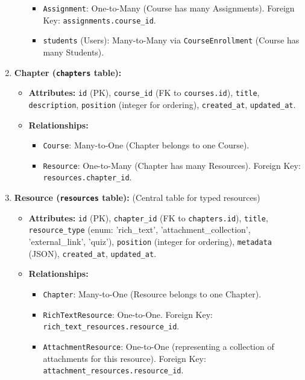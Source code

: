 \begin{enumerate}
\begin{itemize}
\begin{itemize}
            \item \texttt{Assignment}: One-to-Many (Course has many Assignments). Foreign Key: \texttt{assignments.course\_id}.
            \item \texttt{students} (Users): Many-to-Many via \texttt{CourseEnrollment} (Course has many Students).
        \end{itemize}
    \end{itemize}
    \item \textbf{Chapter (\texttt{chapters} table):}
    \begin{itemize}
        \item \textbf{Attributes:} \texttt{id} (PK), \texttt{course\_id} (FK to \texttt{courses.id}), \texttt{title}, \texttt{description}, \texttt{position} (integer for ordering), \texttt{created\_at}, \texttt{updated\_at}.
        \item \textbf{Relationships:}
        \begin{itemize}
            \item \texttt{Course}: Many-to-One (Chapter belongs to one Course).
            \item \texttt{Resource}: One-to-Many (Chapter has many Resources). Foreign Key: \texttt{resources.chapter\_id}.
        \end{itemize}
    \end{itemize}
    \item \textbf{Resource (\texttt{resources} table):} (Central table for typed resources)
    \begin{itemize}
        \item \textbf{Attributes:} \texttt{id} (PK), \texttt{chapter\_id} (FK to \texttt{chapters.id}), \texttt{title}, \texttt{resource\_type} (enum: 'rich\_text', 'attachment\_collection', 'external\_link', 'quiz'), \texttt{position} (integer for ordering), \texttt{metadata} (JSON), \texttt{created\_at}, \texttt{updated\_at}.
        \item \textbf{Relationships:}
        \begin{itemize}
            \item \texttt{Chapter}: Many-to-One (Resource belongs to one Chapter).
            \item \texttt{RichTextResource}: One-to-One. Foreign Key: \texttt{rich\_text\_resources.resource\_id}.
            \item \texttt{AttachmentResource}: One-to-One (representing a collection of attachments for this resource). Foreign Key: \texttt{attachment\_resources.resource\_id}.

\end{itemize}
\end{itemize}
\end{enumerate}
